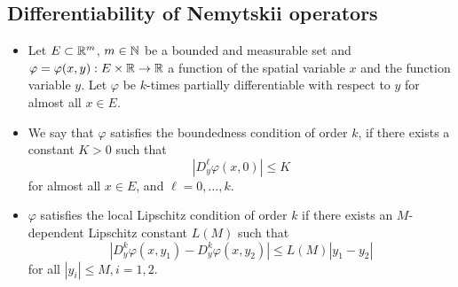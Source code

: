 \documentclass[../skript.tex]{subfiles}
\begin{document}
\subsection{Differentiability of Nemytskii operators}
\begin{itemize}
\item Let $E \subset \mathbb{R}^m$, $m \in \mathbb{N}$ be a bounded and measurable set and $\varphi = \varphi(x, y) : E \times \mathbb{R} \to \mathbb{R}$ a function of the spatial variable $x$ and the function variable $y$. Let $\varphi$ be $k$-times partially differentiable with respect to $y$ for almost all $x \in E$.
\item We say that $\varphi$ satisfies the boundedness condition of order $k$, if there exists a constant $K > 0$ such that
\[
	|D_y^\ell \varphi(x, 0)| \leq K
\]
for almost all $x \in E$, and $\ell = 0, \ldots, k$.
\item $\varphi$ satisfies the local Lipschitz condition of order $k$ if there exists an $M$-dependent Lipschitz constant $L(M)$ such that
\[
	|D_y^k \varphi(x, y_1) - D_y^k \varphi(x, y_2)| \leq L(M) | y_1 - y_2 |
\]
for all $|y_i| \leq M, i = 1, 2$.
\end{itemize}
\end{document}
